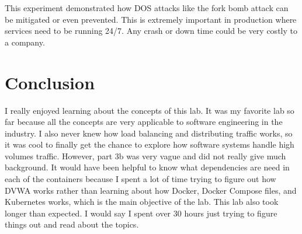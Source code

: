\documentclass[11pt]{article}
\begin{document}
This experiment demonstrated how DOS attacks like the fork bomb attack can be mitigated or even prevented.
This is extremely important in production where services need to be running 24/7.
Any crash or down time could be very costly to a company.

\newpage
\section*{Conclusion}
\label{sec:conclusion}
I really enjoyed learning about the concepts of this lab.
It was my favorite lab so far because all the concepts are very applicable to software engineering in the industry.
I also never knew how load balancing and distributing traffic works, so it was cool to finally get the chance to
explore how software systems handle high volumes traffic.
However, part 3b was very vague and did not really give much background.
It would have been helpful to know what dependencies are need in each of the containers
because I spent a lot of time trying to figure out how DVWA works rather than learning about how Docker,
Docker Compose files, and Kubernetes works, which is the main objective of the lab.
This lab also took longer than expected. I would say I spent over 30 hours just trying to figure things out and read about the topics.

\newpage
\nocite{*}


\end{document}
